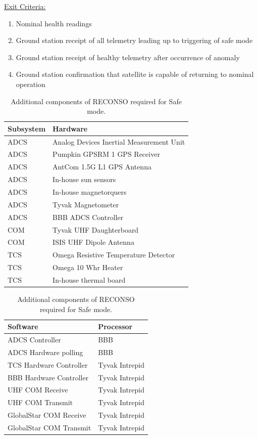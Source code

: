 \documentclass{article}
\begin{document}
\underline{Exit Criteria:}

\begin{enumerate}
\item Nominal health readings 
\item Ground station receipt of all telemetry leading up to triggering of safe mode
\item Ground station receipt of healthy telemetry after occurrence of anomaly
\item Ground station confirmation that satellite is capable of returning to nominal operation
\end{enumerate}

\begin{table}[h!]
\caption{Additional components of RECONSO required for Safe mode.}
\begin{adjustbox}{center}
\begin{tabular}{|l|l|}
\hline
Subsystem & Hardware \\ \hline \hline
ADCS & Analog Devices Inertial Measurement Unit  \\ \hline
ADCS & Pumpkin GPSRM 1 GPS Receiver \\ \hline
ADCS & AntCom 1.5G L1 GPS Antenna  \\ \hline
ADCS & In-house sun sensors  \\ \hline
ADCS & In-house magnetorquers  \\ \hline
ADCS & Tyvak Magnetometer \\ \hline
ADCS & BBB ADCS Controller \\ \hline \hline
COM & Tyvak UHF Daughterboard  \\ \hline
COM & ISIS UHF Dipole Antenna  \\ \hline
TCS & Omega Resistive Temperature Detector \\ \hline
TCS & Omega 10 Whr Heater  \\ \hline
TCS & In-house thermal board \\ \hline
\end{tabular}

\quad

\begin{tabular}{|l|l|}
\hline
Software & Processor \\ \hline \hline
ADCS Controller & BBB \\ \hline
ADCS Hardware polling & BBB \\ \hline \hline
TCS Hardware Controller & Tyvak Intrepid \\ \hline
BBB Hardware Controller & Tyvak Intrepid \\ \hline
UHF COM Receive & Tyvak Intrepid \\ \hline
UHF COM Transmit & Tyvak Intrepid \\ \hline
GlobalStar COM Receive & Tyvak Intrepid \\ \hline
GlobalStar COM Transmit & Tyvak Intrepid \\ \hline
\end{tabular}
\end{adjustbox}
\end{table}
\end{document}
